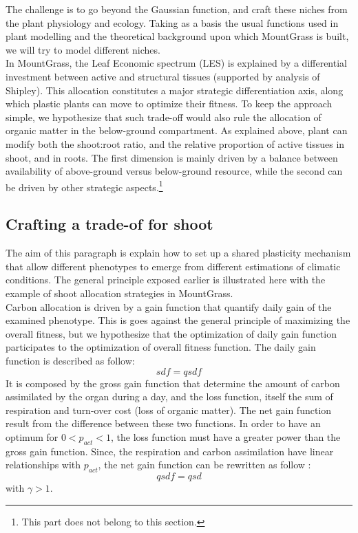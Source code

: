 \documentclass[a4paper, justified,marginals=raggedright]{tufte-handout}
\begin{document}
The challenge is to go beyond the Gaussian function, and craft these niches from the plant physiology and ecology. Taking as a basis the usual functions used in plant modelling and the theoretical background upon which MountGrass is built, we will try to model different niches.\\

\indent In MountGrass, the Leaf Economic spectrum (LES)\cite{Wright-2004} is explained by a differential investment between active and structural tissues (supported by analysis of Shipley\cite{Shipley}). This allocation constitutes a major strategic differentiation axis, along which plastic plants can move to optimize their fitness. To keep the approach simple, we hypothesize that such trade-off would also rule the allocation of organic matter in the below-ground compartment\cite{Reich-2014; Tjoelker-2005}. As explained above, plant can modify both the shoot:root ratio, and the relative proportion of active tissues in shoot, and in roots. The first dimension is mainly driven by a balance between availability of above-ground versus below-ground resource, while the second can be driven by other strategic aspects.\footnote{This part does not belong to this section.}\\
\subsection{Crafting a trade-of for shoot}
\indent The aim of this paragraph is explain how to set up a shared plasticity mechanism that allow different phenotypes to emerge from different estimations of climatic conditions. The general principle exposed earlier is illustrated here with the example of shoot allocation strategies in MountGrass.\\
\indent Carbon allocation is driven by a gain function that quantify daily gain of the examined phenotype. This is goes against the general principle of maximizing the overall fitness, but we hypothesize that the optimization of daily gain function participates to the optimization of overall fitness function. The daily gain function is described as follow:
\begin{equation}
sdf= qsdf
\end{equation}
It is composed by the gross gain function that determine the amount of carbon assimilated by the organ during a day, and the loss function, itself the sum of respiration and turn-over cost (loss of organic matter). The net gain function result from the difference between these two functions. In order to have an optimum for $ 0 < p_{act} < 1$, the loss function must have a greater power than the gross gain function. Since, the respiration and carbon assimilation have linear relationships with $p_{act}$, the net gain function can be rewritten as follow :
\begin{equation}
qsdf =qsd 
\end{equation} 
with $\gamma > 1$.  
\end{document}
